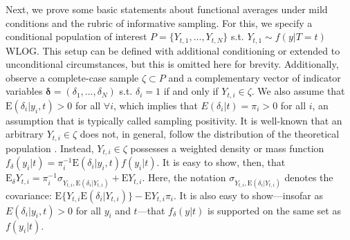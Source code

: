 \documentclass[12pt]{amsart}
\theoremstyle{plain}%
\theoremstyle{definition}
\theoremstyle{remark}
\numberwithin{equation}{section}
\begin{document}
Next, we prove some basic statements about functional averages under mild conditions and the rubric of informative sampling. For this, we specify a conditional population of interest $P= \{ Y_{t, 1}, \ldots , Y_{t, N} \}$ s.t. $Y_{t, 1} \sim f(y| T=t)$ WLOG. This setup can be defined with additional conditioning or extended to unconditional circumstances, but this is omitted here for brevity. Additionally, observe a complete-case sample $\zeta \subset P$ and a complementary vector of indicator variables $\boldsymbol{\delta} = (\delta_1, \ldots, \delta_N)$ s.t. $\delta_i = 1$ if and only if $Y_{t, i} \in \zeta$. We also assume that $\text{E}(\delta_i| y_i, t) > 0$ for all $\forall i$, which implies that $E(\delta_i | t) =\pi_i > 0$ for all $i$, an assumption that is typically called sampling positivity. It is well-known that an arbitrary $Y_{t, i} \in \zeta$ does not, in general, follow the distribution of the theoretical population \cite{pfeffermann2009inference, pfeffermann1998parametric, patil1987weighted, patil1978weighted}. Instead, $Y_{t, i} \in \zeta$ possesses a weighted density or mass function $f_{\delta}(y_{i}| t) = \pi^{-1}_i \text{E}(\delta_i | y_{i}, t) f(y_{i}|t)$. It is easy to show, then, that $\text{E}_{\delta}Y_{t, i} = \pi^{-1}_i \sigma_{Y_{t, i}, \text{E}(\delta_i|Y_{t, i})} + \text{E}Y_{t, i}$. Here, the notation $\sigma_{Y_{t, i}, \text{E}(\delta_i|Y_{t, i})}$ denotes the covariance: $\text{E} \{ Y_{t, i} \text{E}(\delta_i|Y_{t, i}) \} - \text{E}Y_{t, i} \pi_i$. It is also easy to show---insofar as $E(\delta_i| y_i, t) > 0$ for all $y_i$ and $t$---that $f_{\delta}(y|t)$ is supported on the same set as $f(y_i|t)$.
\end{document}
